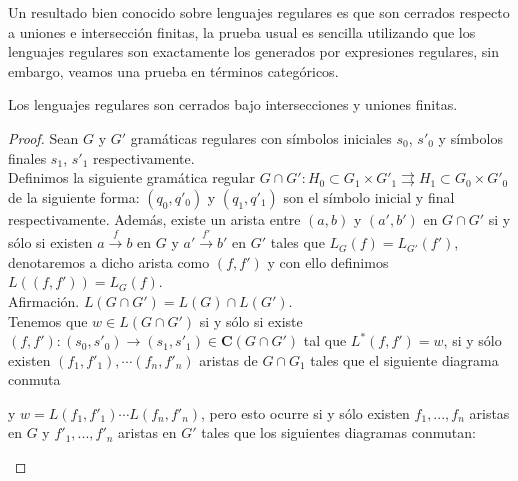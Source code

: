 \documentclass[../main.tex]{subfiles}
\begin{document}
 Un resultado bien conocido sobre lenguajes regulares es que son cerrados respecto a uniones e intersección finitas, la prueba usual es sencilla utilizando que los lenguajes regulares son exactamente los generados por expresiones regulares, sin embargo, veamos una prueba en términos categóricos. 
 
 \begin{prop}
 	Los lenguajes regulares son cerrados bajo intersecciones y uniones finitas. 
 \end{prop}

 \begin{proof}
   	Sean $G$ y $G'$ gramáticas regulares con símbolos iniciales $s_0$, $s'_0$ y símbolos finales $s_1$, $s'_1$ respectivamente. \\
	Definimos la siguiente gramática regular $G \cap G': H_0 \subset G_1 \times G'_1 \rightrightarrows H_1 \subset G_0 \times G'_0$ de la siguiente forma: $(q_0,q'_0)$ y $(q_1,q'_1)$ son el símbolo inicial y final respectivamente. Además, existe un arista entre $(a,b)$ y  $(a',b')$ en $G \cap G'$ si y sólo si existen $a \xrightarrow{f} b$ en $G$ y $a' \xrightarrow{f'} b'$ en $G'$ tales que $L_G(f)=L_{G'}(f')$, denotaremos a dicho arista como $(f,f')$ y con ello definimos $L((f,f'))=L_G(f)$. \\
	Afirmación. $L(G \cap G') = L(G) \cap L(G')$. \\
	Tenemos que $w \in L(G \cap G')$ si y sólo si existe $(f,f'):(s_0,s'_0) \to (s_1, s'_1) \in \mathbf{C}(G\cap G')$ tal que $L^*(f,f')=w$, si y sólo existen $(f_1,f'_1), \cdots (f_n,f'_n)$ aristas de $G \cap G_1$ tales que el siguiente diagrama conmuta
	
	 \begin{center}
	\end{center}
 	y $w=L(f_1,f'_1) \cdots L(f_n,f'_n)$, pero esto ocurre si y sólo existen $f_1, ..., f_n$ aristas en $G$ y $f'_1, ..., f'_n$ aristas en $G'$ tales que los siguientes diagramas conmutan: 
 	\begin{multicols}{2}
 		 \begin{center}
 		\end{center}
 		

\end{multicols}
\end{proof}
\end{document}
